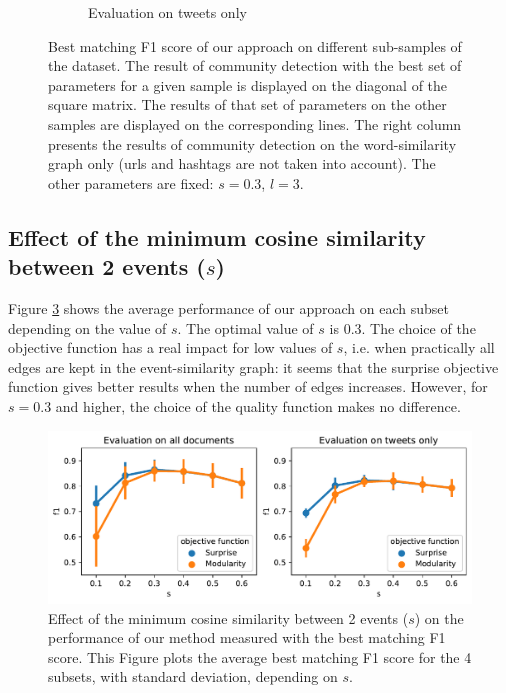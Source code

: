 \begin{figure}
\begin{subfigure}[b]{1\textwidth}
\begin{center}
       \caption{Evaluation on tweets only}
    \label{fig:louvain_macro_tweets}
     \end{center}
\end{subfigure}
\caption[Best matching F1 score of our approach on different sub-samples of the dataset]{Best matching F1 score of our approach on different sub-samples of the dataset. The result of community detection with the best set of parameters for a given sample is displayed on the diagonal of the square matrix. The results of that set of parameters on the other samples are displayed on the corresponding lines. The right column presents the results of community detection on the word-similarity graph only (urls and hashtags are not taken into account). The other parameters are fixed: $s=0.3$, $l=3$.}
\label{fig:louvain_macro}
\end{figure}

\subsection{Effect of the minimum cosine similarity between 2 events ($s$)}
Figure \ref{fig:louvain_macro_sim} shows the average performance of our approach on each subset depending on the value of $s$. The optimal value of $s$ is $0.3$. The choice of the objective function has a real impact for low values of $s$, i.e. when practically all edges are kept in the event-similarity graph: it seems that the surprise objective function gives better results when the number of edges increases. However, for $s=0.3$ and higher, the choice of the quality function makes no difference.

\begin{figure}
    \centering
    \includegraphics[width=1\textwidth]{figures/louvain_macro_sim.pdf}
    \caption[Effect of the minimum cosine similarity between 2 events on the performance of our method.]{Effect of the minimum cosine similarity between 2 events ($s$) on the performance of our method measured with the best matching F1 score. This Figure plots the average best matching F1 score for the 4 subsets, with standard deviation, depending on $s$.}
    \label{fig:louvain_macro_sim}
\end{figure}

